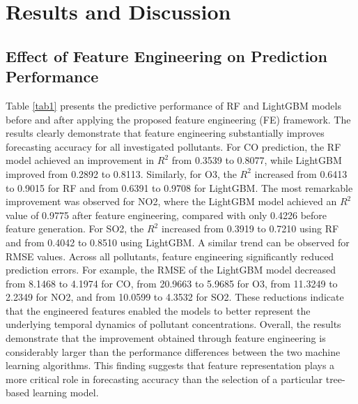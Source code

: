 \documentclass[twoside]{article}
\begin{document}
\section{Results and Discussion}
\subsection{Effect of Feature Engineering on Prediction Performance}
Table \ref{tab1} presents the predictive performance of RF and LightGBM models before and after applying the proposed feature engineering (FE) framework. The results clearly demonstrate that feature engineering substantially improves forecasting accuracy for all investigated pollutants. For CO prediction, the RF model achieved an improvement in $R^{2}$ from 0.3539 to 0.8077, while LightGBM improved from 0.2892 to 0.8113. Similarly, for O3, the $R^{2}$ increased from 0.6413 to 0.9015 for RF and from 0.6391 to 0.9708 for LightGBM. The most remarkable improvement was observed for NO2, where the LightGBM model achieved an $R^{2}$ value of 0.9775 after feature engineering, compared with only 0.4226 before feature generation. For SO2, the $R^{2}$ increased from 0.3919 to 0.7210 using RF and from 0.4042 to 0.8510 using LightGBM.
A similar trend can be observed for RMSE values. Across all pollutants, feature engineering significantly reduced prediction errors. For example, the RMSE of the LightGBM model decreased from 8.1468 to 4.1974 for CO, from 20.9663 to 5.9685 for O3, from 11.3249 to 2.2349 for NO2, and from 10.0599 to 4.3532 for SO2. These reductions indicate that the engineered features enabled the models to better represent the underlying temporal dynamics of pollutant concentrations.
Overall, the results demonstrate that the improvement obtained through feature engineering is considerably larger than the performance differences between the two machine learning algorithms. This finding suggests that feature representation plays a more critical role in forecasting accuracy than the selection of a particular tree-based learning model.
\end{document}
